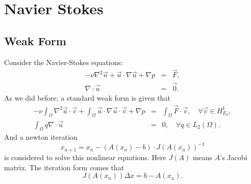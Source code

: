 \documentclass[a4paper]{article}
\begin{document}
\section{Navier Stokes}
\subsection{Weak Form}
Consider the Navier-Stokes equations:
\begin{equation}
\begin{array}{rcl}
-\nu \nabla^2 \vec{u} + \vec{u}\cdot \nabla \vec{u} + \nabla p &=& \vec{F}, \\
\nabla \cdot \vec{u} &=& \vec{0}.
\label{eq::Navier-Stokes-problem}
\end{array}
\end{equation}
As we did before, a standard weak form is given that
\begin{equation}
\begin{array}{rcl}
-\nu\int_\Omega \nabla^2 \vec{u} \cdot
\vec{v} + \int_{\Omega} \vec{u} \cdot \nabla \vec{u} \cdot \vec{v} + \nabla p
& = & \int_{\Omega} \vec{F} \cdot \vec{v}, \quad \forall \vec{v} \in
H^1_{E_0}, \\ \int_\Omega q \nabla \cdot \vec{u} & = & 0, \quad \forall q
\in L_2(\Omega).
\label{eq::Navier-Stokes-weakform}
\end{array}
\end{equation}
And a newton iteration
$$
x_{n+1} = x_{n} - (A(x_n)-b) \cdot J(A(x_{n}))^{-1}
$$ is considered to solve this nonlinear equations. Here $J(A)$ means
$A$'s Jacobi matrix. The iteration form comes that
$$
J(A(x_n))\Delta x = b - A(x_n).
$$

\end{document}
